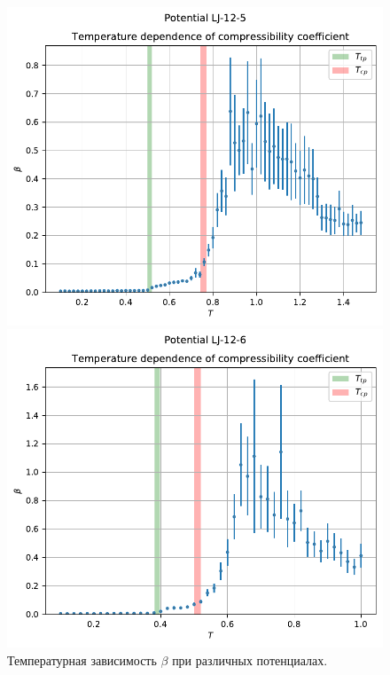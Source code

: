 \documentclass[pdf,hyperref={unicode}]{beamer}
\begin{document}
\begin{frame}
\begin{figure}[h]
\begin{center}
\begin{minipage}[h]{0.35\linewidth}
\includegraphics[width=\textwidth, keepaspectratio]{plot_compress_Potential LJ-12-5_1}
\end{minipage}
\begin{minipage}[h]{0.35\linewidth}
\includegraphics[width=\textwidth, keepaspectratio]{plot_compress_Potential LJ-12-6_1}
\end{minipage}
\caption{\tiny Температурная зависимость $\beta$ при различных потенциалах.}
\label{risBeta}
\end{center}
\end{figure}

\end{frame}
\end{document}
